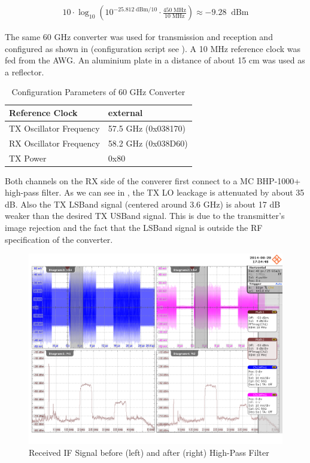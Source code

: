 \begin{align}
  10 \cdot \log_{10}\left(
  10^{-25.812 \;\text{dBm} / 10} \cdot
  \frac{450 \;\text{MHz}}{10 \;\text{MHz}}
  \right) \approx -9.28 \;\;\text{dBm}
  \label{eq:res_450_awg_pwr}
\end{align}

The same 60 GHz converter was used for transmission and reception and
configured as shown in  (configuration script
see ).
A 10 MHz reference clock was fed from the \gls{AWG}.
An aluminium plate in a distance of about 15 cm was used as a reflector. \\

\begin{table}[h]
  \centering
  \begin{tabular}{|l|l|}
    \hline
    Reference Clock & external \\ \hline
    TX Oscillator Frequency & 57.5 GHz (0x038170) \\ \hline
    RX Oscillator Frequency & 58.2 GHz (0x038D60) \\ \hline
    TX Power & 0x80 \\ \hline
  \end{tabular}
  \caption{Configuration Parameters of 60 GHz Converter}
  \label{tab:res_450_sivers}
\end{table}

Both channels on the \gls{RX} side of the converer first connect to a
\gls{MC} BHP-1000+ high-pass filter. As we can see in ,
the \gls{TX} \gls{LO} leackage is attenuated by about 35 dB. Also the \gls{TX}
\gls{LSBand} signal (centered around 3.6 GHz) is about 17 dB weaker than
the desired \gls{TX} \gls{USBand} signal. This is due to the transmitter's
image rejection and the fact that the \gls{LSBand} signal is outside the
\gls{RF} specification of the converter. \\

\begin{figure}[p]
  \centering
  \includegraphics[width=\textwidth]{figures/osci/res_450_rx_if}
  \caption{Received \gls{IF} Signal before (left) and after (right) High-Pass Filter}
  \label{fig:res_450_rx_if}
\end{figure}

